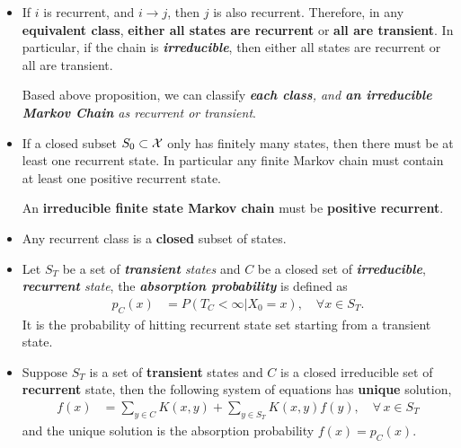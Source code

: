 \documentclass[11pt]{article}
\begin{document}
\begin{itemize}
\item
\begin{proposition}
If $i$ is recurrent, and $i \rightarrow j$, then $j$ is also recurrent. Therefore, in any \textbf{equivalent class}, \textbf{either all states are recurrent} or \textbf{all are transient}. In particular, if the chain is \emph{\textbf{irreducible}}, then either all states are recurrent or all are transient.
\end{proposition}
Based above proposition, we can classify \emph{\textbf{each class}, and \textbf{an irreducible Markov Chain} as recurrent or transient}. 

\item 
\begin{proposition}
If a closed subset $S_0 \subset {\mathcal X}$ only has finitely many states, then there must be at least one recurrent state. In particular any finite Markov chain must contain at least one positive recurrent state. 
\end{proposition}

\begin{proposition}
An \textbf{irreducible finite state Markov chain} must be \textbf{positive recurrent}. 
\end{proposition}


\item 
\begin{proposition}
Any recurrent class is a \textbf{closed} subset of states.
\end{proposition}

\item Let $S_{T}$ be a set of \emph{\textbf{transient} states} and $C$ be a closed set of \emph{\textbf{irreducible}}, \emph{\textbf{recurrent} state}, the \emph{\textbf{absorption probability}} is defined as
\begin{align}
p_{C}(x) &= P(T_{C} < \infty | X_{0} = x), \quad \forall x\in S_{T}.
\end{align} It is the probability of hitting recurrent state set starting from a transient state.

\item \begin{theorem}
Suppose  $S_{T}$ is a set of \textbf{transient} states and $C$ is a closed irreducible set of \textbf{recurrent} state, then the following system of equations has \textbf{unique} solution,
\begin{align}
f(x) &= \sum_{y \in C}K(x, y) + \sum_{y \in S_{T}}K(x, y)f(y), \quad \forall\, x \in S_{T} \label{eqn: trans_recur_eqn_unique_sol}
\end{align} and the unique solution is the absorption probability $f(x) = p_{C}(x)$.
\end{theorem}


\end{itemize}
\end{document}
